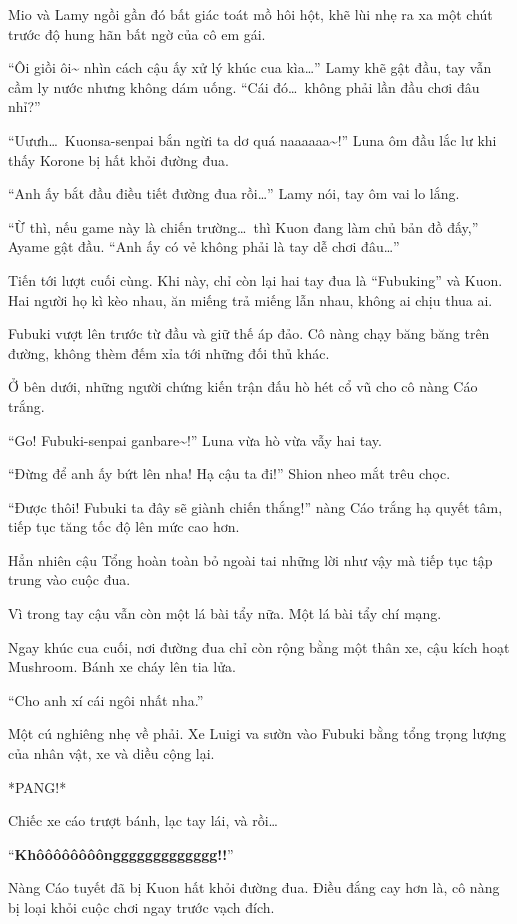 \documentclass[../main.tex]{subfiles}
\begin{document}
Mio và Lamy ngồi gần đó bất giác toát mồ hôi hột, khẽ lùi nhẹ ra xa một chút trước độ hung hãn bất ngờ của cô em gái.

``Ôi giồi ôi\~{} nhìn cách cậu ấy xử lý khúc cua kìa\dots'' Lamy khẽ gật đầu, tay vẫn cầm ly nước nhưng không dám uống. ``Cái đó\dots\ không phải lần đầu chơi đâu nhỉ?''

``Uưưh\dots\ Kuonsa-senpai bắn ngừi ta dơ quá naaaaaa\~{}!'' Luna ôm đầu lắc lư khi thấy Korone bị hất khỏi đường đua.

``Anh ấy bắt đầu điều tiết đường đua rồi\dots'' Lamy nói, tay ôm vai lo lắng.

``Ừ thì, nếu game này là chiến trường\dots\ thì Kuon đang làm chủ bản đồ đấy,'' Ayame gật đầu. ``Anh ấy có vẻ không phải là tay dễ chơi đâu\dots''

Tiến tới lượt cuối cùng. Khi này, chỉ còn lại hai tay đua là ``Fubuking'' và Kuon. Hai người họ kì kèo nhau, ăn miếng trả miếng lẫn nhau, không ai chịu thua ai.

Fubuki vượt lên trước từ đầu và giữ thế áp đảo. Cô nàng chạy băng băng trên đường, không thèm đếm xỉa tới những đối thủ khác.

Ở bên dưới, những người chứng kiến trận đấu hò hét cổ vũ cho cô nàng Cáo trắng.

``Go! Fubuki-senpai ganbare\~{}!'' Luna vừa hò vừa vẫy hai tay.

``Đừng để anh ấy bứt lên nha! Hạ cậu ta đi!'' Shion nheo mắt trêu chọc.

``Được thôi! Fubuki ta đây sẽ giành chiến thắng!'' nàng Cáo trắng hạ quyết tâm, tiếp tục tăng tốc độ lên mức cao hơn.

Hẳn nhiên cậu Tổng hoàn toàn bỏ ngoài tai những lời như vậy mà tiếp tục tập trung vào cuộc đua.

Vì trong tay cậu vẫn còn một lá bài tẩy nữa. Một lá bài tẩy chí mạng.

Ngay khúc cua cuối, nơi đường đua chỉ còn rộng bằng một thân xe, cậu kích hoạt Mushroom. Bánh xe cháy lên tia lửa.

``Cho anh xí cái ngôi nhất nha.''

Một cú nghiêng nhẹ về phải. Xe Luigi va sườn vào Fubuki bằng tổng trọng lượng của nhân vật, xe và diều cộng lại.

*PANG!*

Chiếc xe cáo trượt bánh, lạc tay lái, và rồi\dots

``\textbf{Khôôôôôôôônggggggggggggg!!}''

Nàng Cáo tuyết đã bị Kuon hất khỏi đường đua. Điều đắng cay hơn là, cô nàng bị loại khỏi cuộc chơi ngay trước vạch đích.
\end{document}
